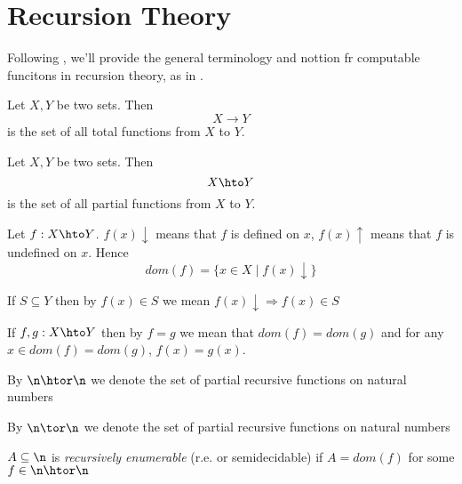 \section{Recursion Theory}

Following \cite{ranzato:analysis}, we'll provide the general
terminology and nottion fr computable funcitons in recursion theory,
as in
\cite{cutland1980computability,odifreddi1992classical,rogers1987theory}.

\begin{definition}
  Let \(X,Y\) be two sets. Then \[X \to Y\] is the set of all total
  functions from \(X\) to \(Y\).
\end{definition}

\begin{definition}
  Let \(X,Y\) be two sets. Then \[X \hto Y\] is the set of all partial
  functions from \(X\) to \(Y\).
\end{definition}

\begin{definition}
  Let \(f : X \hto Y\). \(f(x)\downarrow\) means that \(f\) is defined
  on \(x\), \(f(x)\uparrow\) means that \(f\) is undefined on
  \(x\). Hence \[dom(f) = \{x \in X \mid f(x)\downarrow\}\]
\end{definition}

\begin{notation}
  If \(S\subseteq Y\) then by \(f(x) \in S\) we mean \(f(x)\downarrow
  \Rightarrow f(x) \in S\)
\end{notation}

\begin{notation}
  If \(f,g : X \hto Y\) then by \(f=g\) we mean that \(dom(f) =
  dom(g)\) and for any \(x \in dom(f) = dom(g)\), \(f(x) = g(x)\).
\end{notation}

\begin{notation}
  By \(\n \htor \n\) we denote the set of partial recursive functions
  on natural numbers
\end{notation}

\begin{notation}
  By \(\n \tor \n\) we denote the set of partial recursive functions
  on natural numbers
\end{notation}

\begin{definition}
  \(A \subseteq \n\) is \emph{recursively enumerable} (r.e. or
  semidecidable) if \(A = dom(f)\) for some \(f \in \n \htor \n\)
\end{definition}

